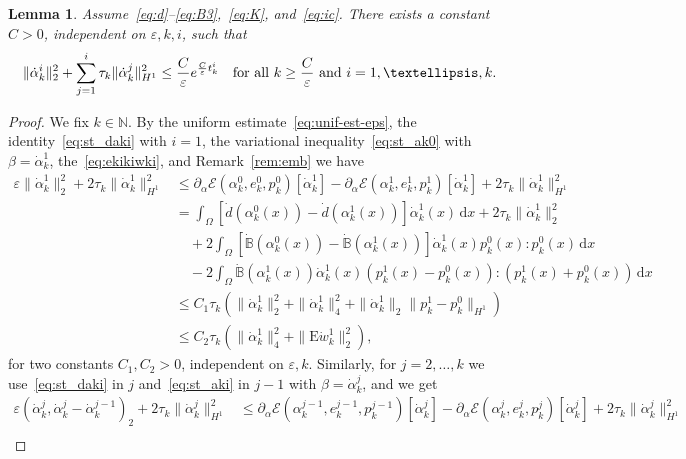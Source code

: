 \documentclass[reqno]{amsart}
\newtheorem{lemma}[corollary]{Lemma}
\theoremstyle{definition}
\numberwithin{equation}{section}
\def\de {\mathrm{d}}
\def\N {\mathbb N}
\def\B {\mathbb B}
\def\EE {\mathrm{E}}
\begin{document}
\begin{lemma}\label{lem:w11-est}
Assume~\eqref{eq:d}--\eqref{eq:B3},~\eqref{eq:K}, and~\eqref{eq:ic}. There exists a constant $C>0$, independent on $\varepsilon,k,i$, such that
\begin{align}\label{eq:eps_est}
\|\dot\alpha_k^i\|_2^2+\sum_{j=1}^i\tau_k\|\dot\alpha_k^j\|_{H^1}^2\le \frac{C}{\varepsilon}{\rm e}^{\frac{C}{\varepsilon}t_k^i}\quad\text{for all $k\ge \frac{C}{\varepsilon}$ and $i=1,\dots,k$.}
\end{align}
\end{lemma}

\begin{proof}
We fix $k\in\N$. By the uniform estimate~\eqref{eq:unif-est-eps}, the identity~\eqref{eq:st_daki} with $i=1$, the variational inequality~\eqref{eq:st_ak0} with $\beta=\dot\alpha_k^1$, the~\eqref{eq:ekikiwki}, and Remark~\ref{rem:emb} we have 
\begin{align}
\varepsilon\|\dot\alpha_k^1\|_2^2+2\tau_k\|\dot\alpha_k^1\|_{H^1}^2&\le\partial_\alpha\mathcal E(\alpha_k^0,e_k^0,p_k^0)[\dot\alpha_k^1]-\partial_\alpha\mathcal E(\alpha_k^1,e_k^1,p_k^1)[\dot\alpha_k^1]+2\tau_k\|\dot\alpha_k^1\|_{H^1}^2\nonumber\\
&=\int_\Omega [\dot{d}(\alpha_k^0(x))-\dot{d}(\alpha_k^1(x))]\dot\alpha_k^1(x) \,\de x+2\tau_k\|\dot\alpha_k^1\|_2^2\nonumber\\
&\quad+2\int_\Omega [\dot{\B}(\alpha_k^0(x))-\dot{\B}(\alpha_k^1(x))]\dot\alpha_k^1(x)p_k^0(x):p_k^0(x) \,\de x\nonumber\\
&\quad-2\int_\Omega \dot{\B}(\alpha_k^1(x))\dot\alpha_k^1(x)(p_k^1(x)-p_k^0(x)):(p_k^1(x)+p_k^0(x)) \,\de x\nonumber\\
&\le C_1\tau_k(\|\dot\alpha_k^1\|_2^2+\|\dot\alpha_k^1\|_4^2+\|\dot\alpha_k^1\|_2\|p_k^1-p_k^0\|_{H^1})\nonumber\\
&\le C_2\tau_k(\|\dot\alpha_k^1\|_4^2+\|\EE \dot w_k^1\|_2^2),\label{eq:ak1-est}
\end{align}
for two constants $C_1,C_2>0$, independent on $\varepsilon,k$. Similarly, for $j=2,\dots,k$ we use~\eqref{eq:st_daki} in $j$ and~\eqref{eq:st_aki} in $j-1$ with $\beta=\dot\alpha_k^j$, and we get
\begin{align}
\varepsilon(\dot\alpha_k^j,\dot\alpha_k^j-\dot\alpha_k^{j-1})_2+2\tau_k\|\dot\alpha_k^j\|_{H^1}^2&\le\partial_\alpha\mathcal E(\alpha_k^{j-1},e_k^{j-1},p_k^{j-1})[\dot\alpha_k^j]-\partial_\alpha\mathcal E(\alpha_k^j,e_k^j,p_k^j)[\dot\alpha_k^j]+2\tau_k\|\dot\alpha_k^j\|_{H^1}^2\nonumber\\

\end{align}
\end{proof}
\end{document}
